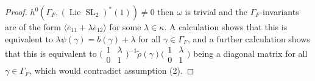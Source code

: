 \documentclass{amsart}
\theoremstyle{definition}
\theoremstyle{remark}
\DeclareMathOperator{\SL}{SL}
\DeclareMathOperator{\Lie}{Lie}
\begin{document}
\begin{proof}
$h^0(\Gamma_F, (\Lie \SL_2)^*(1))\neq 0$ then $\omega$ is trivial and the $\Gamma_F$-invariants
are of the form $\langle \bar{e}_{11} + \lambda \bar{e}_{12}\rangle$ for some $\lambda\in \kappa$. 
A calculation shows that this is equivalent to $\lambda\psi(\gamma)= b(\gamma)+\lambda$ for all 
$\gamma\in \Gamma_F$, and a further calculation shows that this is equivalent to 
$\bigl (\begin{smallmatrix} 1 & \lambda\\ 0 & 1\end{smallmatrix} \bigr)^{-1} \tilde{\rho}(\gamma)
\bigl (\begin{smallmatrix} 1 & \lambda\\ 0 & 1\end{smallmatrix} \bigr)$ being a diagonal matrix 
for all $\gamma\in \Gamma_F$, which would contradict assumption (2). 
\end{proof}
\end{document}
